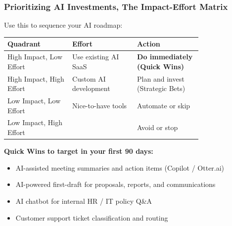 \begin{frame}[fragile]\frametitle{Prioritizing AI Investments, The Impact-Effort Matrix}

Use this to sequence your AI roadmap:
\begin{center}
\begin{tabular}{|p{0.26\linewidth}|p{0.26\linewidth}|p{0.26\linewidth}|}

\hline
\textbf{Quadrant} & \textbf{Effort} & \textbf{Action} \\
\hline
High Impact, Low Effort & Use existing AI SaaS & \textbf{Do immediately (Quick Wins)} \\
High Impact, High Effort & Custom AI development & Plan and invest (Strategic Bets) \\
Low Impact, Low Effort & Nice-to-have tools & Automate or skip \\
Low Impact, High Effort & & Avoid or stop \\
\hline
\end{tabular}
\end{center}

\textbf{Quick Wins to target in your first 90 days:}
\begin{itemize}
  \item AI-assisted meeting summaries and action items (Copilot / Otter.ai)
  \item AI-powered first-draft for proposals, reports, and communications
  \item AI chatbot for internal HR / IT policy Q\&A
  \item Customer support ticket classification and routing
\end{itemize}

\end{frame}

